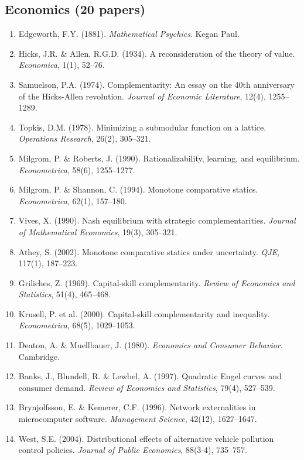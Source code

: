 \subsection{Economics (20 papers)}

\begin{enumerate}
    \item Edgeworth, F.Y. (1881). \textit{Mathematical Psychics}. Kegan Paul.
    \item Hicks, J.R. \& Allen, R.G.D. (1934). A reconsideration of the theory of value. \textit{Economica}, 1(1), 52--76.
    \item Samuelson, P.A. (1974). Complementarity: An essay on the 40th anniversary of the Hicks-Allen revolution. \textit{Journal of Economic Literature}, 12(4), 1255--1289.
    \item Topkis, D.M. (1978). Minimizing a submodular function on a lattice. \textit{Operations Research}, 26(2), 305--321.
    \item Milgrom, P. \& Roberts, J. (1990). Rationalizability, learning, and equilibrium. \textit{Econometrica}, 58(6), 1255--1277.
    \item Milgrom, P. \& Shannon, C. (1994). Monotone comparative statics. \textit{Econometrica}, 62(1), 157--180.
    \item Vives, X. (1990). Nash equilibrium with strategic complementarities. \textit{Journal of Mathematical Economics}, 19(3), 305--321.
    \item Athey, S. (2002). Monotone comparative statics under uncertainty. \textit{QJE}, 117(1), 187--223.
    \item Griliches, Z. (1969). Capital-skill complementarity. \textit{Review of Economics and Statistics}, 51(4), 465--468.
    \item Krusell, P. et al. (2000). Capital-skill complementarity and inequality. \textit{Econometrica}, 68(5), 1029--1053.
    \item Deaton, A. \& Muellbauer, J. (1980). \textit{Economics and Consumer Behavior}. Cambridge.
    \item Banks, J., Blundell, R. \& Lewbel, A. (1997). Quadratic Engel curves and consumer demand. \textit{Review of Economics and Statistics}, 79(4), 527--539.
    \item Brynjolfsson, E. \& Kemerer, C.F. (1996). Network externalities in microcomputer software. \textit{Management Science}, 42(12), 1627--1647.
    \item West, S.E. (2004). Distributional effects of alternative vehicle pollution control policies. \textit{Journal of Public Economics}, 88(3-4), 735--757.

\end{enumerate}
